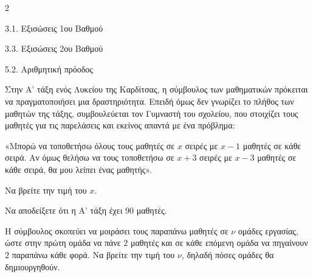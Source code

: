 \begin{ylh}{2}
    \item 3.1. Εξισώσεις 1ου Βαθμού
    \item 3.3. Εξισώσεις 2ου Βαθμού
    \item 5.2. Αριθμητική πρόοδος
\end{ylh}
Στην Α' τάξη ενός Λυκείου της Καρδίτσας, η σύμβουλος των μαθηματικών πρόκειται να πραγματοποιήσει μια δραστηριότητα. Επειδή όμως δεν γνωρίζει το πλήθος των μαθητών της τάξης, συμβουλεύεται τον Γυμναστή του σχολείου, που στοιχίζει τους μαθητές για τις παρελάσεις και εκείνος απαντά με ένα πρόβλημα:

«Μπορώ να τοποθετήσω όλους τους μαθητές σε $x$ σειρές με $x - 1$ μαθητές σε κάθε σειρά. Αν όμως θελήσω να τους τοποθετήσω σε $x + 3$ σειρές με $x - 3$ μαθητές σε κάθε σειρά, θα μου λείπει ένας μαθητής».

\begin{alist}
\item Να βρείτε την τιμή του $x$.
\item Να αποδείξετε ότι η Α' τάξη έχει $90$ μαθητές.
\item Η σύμβουλος σκοπεύει να μοιράσει τους παραπάνω μαθητές σε $\nu$ ομάδες εργασίας, ώστε στην πρώτη ομάδα να πάνε $2$ μαθητές και σε κάθε επόμενη ομάδα να πηγαίνουν $2$ παραπάνω κάθε φορά. Να βρείτε την τιμή του $\nu$, δηλαδή πόσες ομάδες θα δημιουργηθούν.
\end{alist}

